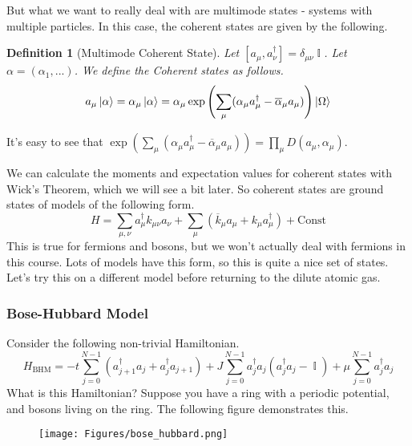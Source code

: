 \documentclass{article}
\DeclareMathOperator{\II}{\mathbb{I}}
\newtheorem{defn}{Definition}
\begin{document}
But what we want to really deal with are multimode states - systems with multiple particles. In this case, the coherent states are given by the following. 
\begin{defn}[Multimode Coherent State] Let $[a_\mu,a_\nu^\dagger]=\delta_{\mu\nu}\II$. Let $\alpha = (\alpha_1,...)$. We define the Coherent states as follows.
\begin{equation}
a_\mu\ket{\alpha} = \alpha_\mu\ket{\alpha} = \alpha_\mu \exp\left(\sum_{\mu} (\alpha_\mu a_\mu^\dagger - \overline\alpha_\mu a_\mu)\right)\ket{\Omega}
\end{equation}
\end{defn}
It's easy to see that $ \exp\left(\sum_{\mu} (\alpha_\mu a_\mu^\dagger - \overline\alpha_\mu a_\mu)\right) = \prod_\mu D(a_\mu,\alpha_\mu)$.

We can calculate the moments and expectation values for coherent states with Wick's Theorem, which we will see a bit later.  So coherent states are ground states of models of the following form.
\begin{equation}
H=\sum_{\mu,\nu}a_\mu^\dagger k_{\mu\nu}a_\nu + \sum_{\mu}\left(\overline k_\mu a_\mu + k_\mu a_\mu^\dagger\right) + \textrm{Const}
\end{equation}
This is true for fermions and bosons, but we won't actually deal with fermions in this course. Lots of models have this form, so this is quite a nice set of states. Let's try this on a different model before returning to the dilute atomic gas. 
\subsubsection{Bose-Hubbard Model}
Consider the following non-trivial Hamiltonian.
\begin{equation}
H_{\textrm{BHM}} = -t \sum_{j=0}^{N-1}( a_{j+1}^\dagger a_j + a_j^\dagger a_{j+1}) + J\sum_{j=0}^{N-1}a_j^\dagger a_j(a_j^\dagger a_j - \II) + \mu\sum_{j=0}^{N-1}a_j^\dagger a_j
\end{equation}
What is this Hamiltonian? Suppose you have a ring with a periodic potential, and bosons living on the ring. The following figure demonstrates this. 
\begin{figure}[ht]
    \centering
    \texttt{[image: Figures/bose\_hubbard.png]}
    \caption*{}
    \label{fig:bhub}
\end{figure}
\end{document}
